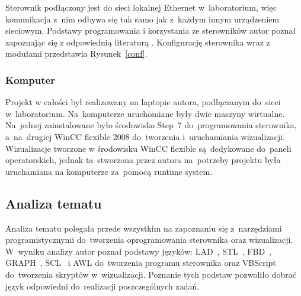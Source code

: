 \indent
\indent Sterownik podłączony jest do sieci lokalnej Ethernet w~laboratorium, więc komunikacja z~nim odbywa się tak samo jak z~każdym innym urządzeniem sieciowym. Podstawy programowania i korzystania ze sterowników autor poznał zapoznając się z odpowiednią literaturą \cite{plc1,plc2,plc4,plc5,plc6}.
Konfigurację sterownika wraz z modułami przedstawia Rysunek~\ref{conf}.

\subsubsection{Komputer}
Projekt w całości był realizowany na laptopie autora, podłączanym do~sieci w~laboratorium. Na~komputerze uruchomiane były dwie maszyny wirtualne. Na~jednej zainstalowane było środowisko Step~7 do~programowania sterownika, a~na~drugiej WinCC flexible 2008 do~tworzenia i~uruchamiania wizualizacji. Wizualizacje tworzone w środowisku WinCC flexible są~dedykowane do~paneli operatorskich, jednak ta~stworzona przez autora na~potrzeby projektu była uruchamiana na komputerze za~pomocą runtime system.

\subsection{Analiza tematu}
Analiza tematu polegała przede wszystkim na zapoznaniu się z~narzędziami programistycznymi do~tworzenia oprogramowania sterownika oraz wizualizacji.
W~wyniku analizy autor poznał podstawy języków: LAD~\cite{step1,step2,step3}, STL~\cite{step1,step2,step3}, FBD~\cite{step1,step2,step3}, GRAPH~\cite{step3}, SCL~\cite{scl1,scl2,scl3} i AWL do~tworzenia programu sterownika oraz VBScript do~tworzenia skryptów w~wizualizacji. Poznanie tych podstaw pozwoliło dobrać język odpowiedni do~realizacji poszczególnych zadań.

